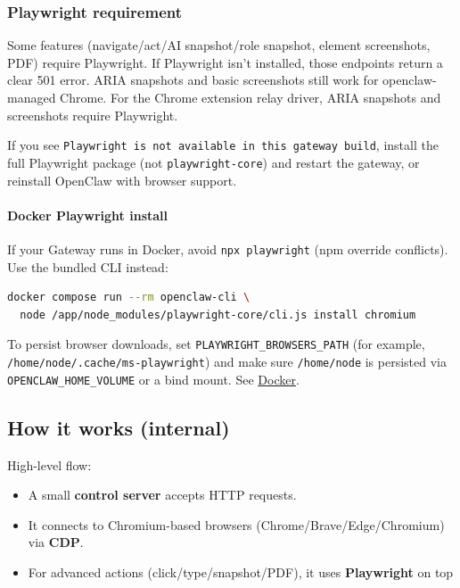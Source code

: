 \subsubsection{Playwright requirement}


Some features (navigate/act/AI snapshot/role snapshot, element screenshots, PDF) require
Playwright. If Playwright isn’t installed, those endpoints return a clear 501
error. ARIA snapshots and basic screenshots still work for openclaw-managed Chrome.
For the Chrome extension relay driver, ARIA snapshots and screenshots require Playwright.

If you see \texttt{Playwright is not available in this gateway build}, install the full
Playwright package (not \texttt{playwright-core}) and restart the gateway, or reinstall
OpenClaw with browser support.

\paragraph{Docker Playwright install}


If your Gateway runs in Docker, avoid \texttt{npx playwright} (npm override conflicts).
Use the bundled CLI instead:

\begin{lstlisting}[language=bash]
docker compose run --rm openclaw-cli \
  node /app/node_modules/playwright-core/cli.js install chromium
\end{lstlisting}


To persist browser downloads, set \texttt{PLAYWRIGHT\_BROWSERS\_PATH} (for example,
\texttt{/home/node/.cache/ms-playwright}) and make sure \texttt{/home/node} is persisted via
\texttt{OPENCLAW\_HOME\_VOLUME} or a bind mount. See \href{/install/docker}{Docker}.

\subsection{How it works (internal)}


High-level flow:

\begin{itemize}
  \item A small \textbf{control server} accepts HTTP requests.
  \item It connects to Chromium-based browsers (Chrome/Brave/Edge/Chromium) via \textbf{CDP}.
  \item For advanced actions (click/type/snapshot/PDF), it uses \textbf{Playwright} on top
\end{itemize}

